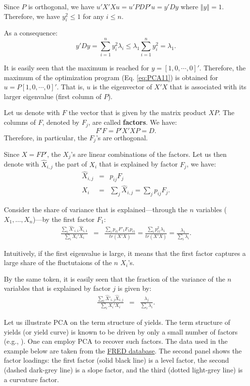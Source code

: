 \documentclass[
  11pt,
]{book}
\theoremstyle{definition}
\theoremstyle{definition}
\theoremstyle{definition}
\theoremstyle{definition}
\theoremstyle{remark}
\begin{document}
Since \(P\) is orthogonal, we have \(u'X'Xu=u'PDP'u=y'Dy\) where \(\left\Vert y\right\Vert =1\). Therefore, we have \(y_{i}^{2}\leq 1\) for any \(i\leq n\).

As a consequence:
\[
y'Dy=\sum_{i=1}^{n}y_{i}^{2}\lambda_{i}\leq\lambda_{1}\sum_{i=1}^{n}y_{i}^{2}=\lambda_{1}.
\]

It is easily seen that the maximum is reached for \(y=\left[1,0,\cdots,0\right]'\). Therefore, the maximum of the optimization program (Eq. \eqref{eq:PCA11}) is obtained for \(u=P\left[1,0,\cdots,0\right]'\). That is, \(u\) is the eigenvector of \(X'X\) that is associated with its larger eigenvalue (first column of \(P\)).

Let us denote with \(F\) the vector that is given by the matrix product \(XP\). The columns of \(F\), denoted by \(F_{j}\), are called \textbf{factors}. We have:
\[
F'F=P'X'XP=D.
\]
Therefore, in particular, the \(F_{j}\)'s are orthogonal.

Since \(X=FP'\), the \(X_{j}\)'s are linear combinations of the factors. Let us then denote with \(\hat{X}_{i,j}\) the part of \(X_{i}\) that is explained by factor \(F_{j}\), we have:
\begin{eqnarray*}
\hat{X}_{i,j} & = & p_{ij}F_{j}\\
X_{i} & = & \sum_{j}\hat{X}_{i,j}=\sum_{j}p_{ij}F_{j}.
\end{eqnarray*}

Consider the share of variance that is explained---through the \(n\) variables (\(X_{1},\ldots,X_{n}\))---by the first factor \(F_{1}\):
\begin{eqnarray*}
\frac{\sum_{i}\hat{X}'_{i,1}\hat{X}_{i,1}}{\sum_{i}X_{i}'X_{i}} & = & \frac{\sum_{i}p_{i1}F'_{1}F_{1}p_{i1}}{tr(X'X)} = \frac{\sum_{i}p_{i1}^{2}\lambda_{1}}{tr(X'X)} = \frac{\lambda_{1}}{\sum_{i}\lambda_{i}}.
\end{eqnarray*}

Intuitively, if the first eigenvalue is large, it means that the first factor captures a large share of the fluctutaions of the \(n\) \(X_{i}\)'s.

By the same token, it is easily seen that the fraction of the variance of the \(n\) variables that is explained by factor \(j\) is given by:
\begin{eqnarray*}
\frac{\sum_{i}\hat{X}'_{i,j}\hat{X}_{i,j}}{\sum_{i}X_{i}'X_{i}} & = & \frac{\lambda_{j}}{\sum_{i}\lambda_{i}}.
\end{eqnarray*}

Let us illustrate PCA on the term structure of yields. The term structure of yields (or yield curve) is known to be driven by only a small number of factors (e.g., \citet{Litterman_Scheinkman_1991}). One can employ PCA to recover such factors. The data used in the example below are taken from the \href{https://fred.stlouisfed.org}{FRED database}. The second panel shows the factor loadings: the first factor (solid black line) is a level factor, the second (dashed dark-grey line) is a slope factor, and the third (dotted light-grey line) is a curvature factor.
\end{document}
